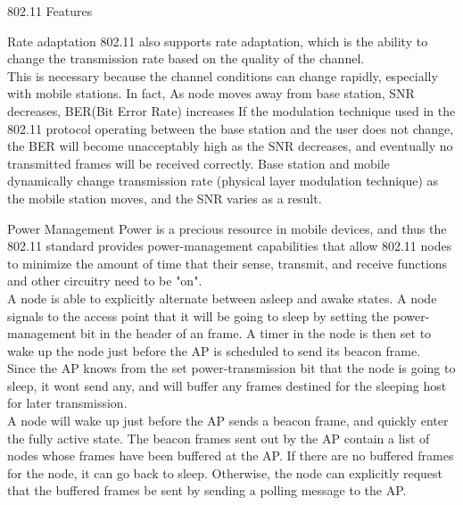 \begin{section}{802.11 Features}
\begin{subsection}{Rate adaptation}
    802.11 also supports rate adaptation, which is the ability to change the transmission rate 
    based on the quality of the channel.\\
    This is necessary because the channel conditions can change rapidly, especially with mobile
    stations. In fact, As node moves away from base station, SNR decreases, BER(Bit Error Rate) increases
    If the modulation technique used in the 802.11 protocol operating between the base
    station and the user does not change, the BER will become unacceptably high as the
    SNR decreases, and eventually no transmitted frames will be received correctly.
    Base station and mobile dynamically change transmission rate (physical layer modulation technique) 
    as the mobile station moves, and the SNR varies as a result.
  \end{subsection}
  \begin{subsection}{Power Management}
    \label{sub:power management}
    Power is a precious resource in mobile devices, and thus the 802.11 standard provides 
    power-management capabilities that allow 802.11 nodes to minimize the amount of time that 
    their sense, transmit, and receive functions and other circuitry need to be "on".\\
    A node is able to explicitly alternate between asleep and awake states. A node signals to the 
    access point that it will be going to sleep by setting the power-management bit in the header 
    of an frame. A timer in the node is then set to wake up the node just before the AP is 
    scheduled to send its beacon frame.\\
    Since the AP knows from the set power-transmission bit that the node is going to sleep, it wont
    send any, and will buffer any frames destined for the sleeping host for later transmission.\\ A
    node will wake up just before the AP sends a beacon frame, and quickly enter the fully active
    state.
    The beacon frames sent out by the AP contain a list of nodes whose frames have been buffered 
    at the AP. If there are no buffered frames for the node, it can go back to sleep. Otherwise, 
    the node can explicitly request that the buffered frames be sent by sending a polling message 
    to the AP.


\end{subsection}
\end{section}

